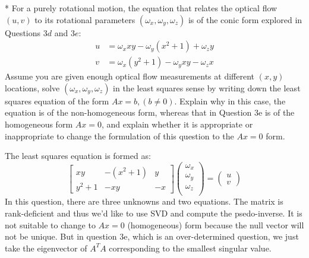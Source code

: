 \begin{questions}
\question
* For a purely rotational motion, the equation that relates the optical flow $(u, v)$ to its rotational parameters $(\omega_{x}, \omega_{y}, \omega_{z})$ is of the conic form explored in Questions $3d$ and $3e$:
\begin{equation}
        \begin{aligned} u &=\omega_{x} x y-\omega_{y}\left(x^{2}+1\right)+\omega_{z} y \\ v &=\omega_{x}\left(y^{2}+1\right)-\omega_{y} x y-\omega_{z} x \end{aligned}
\end{equation}
Assume you are given enough optical flow measurements at different $(x, y)$ locations, solve $(\omega _ {x}, \omega _ {y}, \omega _ {z})$ in the least squares sense by writing down the least squares equation of the form $Ax=b, (b \neq 0)$. Explain why in this case, the equation is of the non-homogeneous form, whereas that in Question 3e is of the homogeneous form $Ax=0$, and explain whether it is appropriate or inappropriate to change the formulation of this question to the $Ax=0$ form.

\begin{solution}
    The least squares equation is formed as:
    \begin{equation}
        \begin{bmatrix}
            xy & -(x^{2} + 1) & y \\
            y ^ {2} + 1 & -xy & -x
        \end{bmatrix}
        \left( \begin{array}{c}
           \omega _ {x} \\  
           \omega _ {y} \\  
           \omega _ {z} \\  
        \end{array}\right) = \left(\begin{array}{c}
             u \\
             v
        \end{array}\right)
    \end{equation}
    In this question, there are three unknowns and two equations. The matrix is rank-deficient and thus we'd like to use SVD and compute the psedo-inverse. It is not suitable to change to $Ax=0$ (homogeneous) form because the null vector will not be unique. But in question 3e, which is an over-determined question, we just take the eigenvector of $A^{T}A$ corresponding to the smallest singular value.
    
\end{solution}
    


\end{questions}
    




